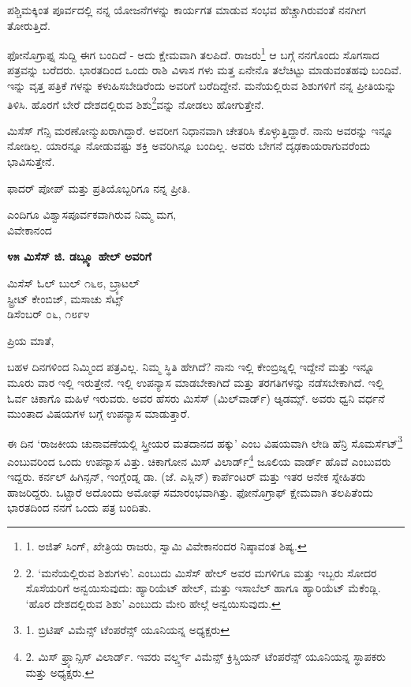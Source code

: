 ಪಶ್ಚಿಮಕ್ಕಿಂತ ಪೂರ್ವದಲ್ಲಿ ನನ್ನ ಯೋಜನೆಗಳನ್ನು ಕಾರ್ಯಗತ ಮಾಡುವ ಸಂಭವ ಹೆಚ್ಚಾಗಿರುವಂತೆ ನನಗೀಗ ತೋರುತ್ತಿದೆ.

ಫೋನೊಗ್ರಾಫ್ನ ಸುದ್ದಿ ಈಗ ಬಂದಿದೆ - ಅದು ಕ್ಷೇಮವಾಗಿ ತಲಪಿದೆ. ರಾಜರು\footnote{1. ಅಜಿತ್ ಸಿಂಗ್, ಖೇತ್ರಿಯ ರಾಜರು, ಸ್ವಾಮಿ ವಿವೇಕಾನಂದರ ನಿಷ್ಠಾವಂತ ಶಿಷ್ಯ.} ಆ ಬಗ್ಗೆ ನನಗೊಂದು ಸೊಗಸಾದ ಪತ್ರವನ್ನು ಬರೆದರು. ಭಾರತದಿಂದ ಒಂದು ರಾಶಿ ವಿಳಾಸ ಗಳು ಮತ್ತ ಏನೇನೊ ತಲೆಚಿಟ್ಟು ಮಾಡುವಂತಹವು ಬಂದಿವೆ. ಇನ್ನು ವೃತ್ತ ಪತ್ರಿಕೆ ಗಳನ್ನು ಕಳುಹಿಸಬೇಡಿರೆಂದು ಅವರಿಗೆ ಬರೆದಿದ್ದೇನೆ. ಮನೆಯಲ್ಲಿರುವ ಶಿಶುಗಳಿಗೆ ನನ್ನ ಪ್ರೀತಿಯನ್ನು ತಿಳಿಸಿ. ಹೊರಗೆ ಬೇರೆ ದೇಶದಲ್ಲಿರುವ ಶಿಶು\footnote{2. ‘ಮನೆಯಲ್ಲಿರುವ ಶಿಶುಗಳು’. ಎಂಬುದು ಮಿಸೆಸ್ ಹೇಲ್ ಅವರ ಮಗಳಿಗೂ ಮತ್ತು ಇಬ್ಬರು ಸೋದರ ಸೊಸೆಯರಿಗೆ ಅನ್ವಯಿಸುವುದು: ಹ್ಯಾರಿಯೆಟ್ ಹೇಲ್, ಮತ್ತು ಇಸಾಬೆಲ್ ಹಾಗೂ ಹ್ಯಾರಿಯೆಟ್ ಮೆಕೆಂಡ್ಲಿ. ‘ಹೊರ ದೇಶದಲ್ಲಿರುವ ಶಿಶು’ ಎಂಬುದು ಮೇರಿ ಹೇಲ್ಗೆ ಅನ್ವಯಿಸುವುದು.}ವನ್ನು ನೋಡಲು ಹೋಗುತ್ತೇನೆ.

ಮಿಸೆಸ್ ಗೆನ್ಸಿ ಮರಣೋನ್ಮುಖರಾಗಿದ್ದಾರೆ. ಅವರೀಗ ನಿಧಾನವಾಗಿ ಚೇತರಿಸಿ ಕೊಳ್ಳುತ್ತಿದ್ದಾರೆ. ನಾನು ಅವರನ್ನು ಇನ್ನೂ ನೋಡಿಲ್ಲ. ಯಾರನ್ನೂ ನೋಡುವಷ್ಟು ಶಕ್ತಿ ಅವರಿಗಿನ್ನೂ ಬಂದಿಲ್ಲ. ಅವರು ಬೇಗನೆ ದೃಢಕಾಯರಾಗುವರೆಂದು ಭಾವಿಸುತ್ತೇನೆ.

ಫಾದರ್ ಪೋಪ್ ಮತ್ತು ಪ್ರತಿಯೊಬ್ಬರಿಗೂ ನನ್ನ ಪ್ರೀತಿ.

\begin{flushright}
ಎಂದಿಗೂ ವಿಶ್ವಾಸಪೂರ್ವಕವಾಗಿರುವ ನಿಮ್ಮ ಮಗ,\\ವಿವೇಕಾನಂದ
\end{flushright}

\begin{center}
\textbf{೪೫ ಮಿಸೆಸ್ ಜಿ. ಡಬ್ಲ್ಯೂ ಹೇಲ್ ಅವರಿಗೆ}
\end{center}

\begin{flushright}
 ಮಿಸೆಸ್ ಓಲ್ ಬುಲ್ ೧೬೮, ಬ್ರ್ಯಾಟಲ್\\ಸ್ಟ್ರೀಟ್ ಕೇಂಬಿಜ್, ಮಸಾಚು ಸೆಟ್ಸ್\\ಡಿಸೆಂಬರ್ ೦೬, ೧೮೯೪
\end{flushright}

ಪ್ರಿಯ ಮಾತೆ,

ಬಹಳ ದಿನಗಳಿಂದ ನಿಮ್ಮಿಂದ ಪತ್ರವಿಲ್ಲ. ನಿಮ್ಮ ಸ್ಥಿತಿ ಹೇಗಿದೆ? ನಾನು ಇಲ್ಲಿ ಕೇಂಬ್ರಿಜ್ನಲ್ಲಿ ಇದ್ದೇನೆ ಮತ್ತು ಇನ್ನೂ ಮೂರು ವಾರ ಇಲ್ಲಿ ಇರುತ್ತೇನೆ. ಇಲ್ಲಿ ಉಪನ್ಯಾಸ ಮಾಡಬೇಕಾಗಿದೆ ಮತ್ತು ತರಗತಿಗಳನ್ನು ನಡೆಸಬೇಕಾಗಿದೆ. ಇಲ್ಲಿ ಓರ್ವ ಚಿಕಾಗೊ ಮಹಿಳೆ ಇರುವರು. ಅವರ ಹೆಸರು ಮಿಸೆಸ್ (ಮಿಲ್​ವಾರ್ಡ್) ಆ್ಯಡಮ್ಸ್. ಅವರು ಧ್ವನಿ ವರ್ಧನೆ ಮುಂತಾದ ವಿಷಯಗಳ ಬಗ್ಗೆ ಉಪನ್ಯಾಸ ಮಾಡುತ್ತಾರೆ.

ಈ ದಿನ ‘ರಾಜಕೀಯ ಚುನಾವಣೆಯಲ್ಲಿ ಸ್ತ್ರೀಯರ ಮತದಾನದ ಹಕ್ಕು’ ಎಂಬ ವಿಷಯವಾಗಿ ಲೇಡಿ ಹೆನ್ರಿ ಸೊಮರ್ಸೆಟ್\footnote{1. ಬ್ರಿಟಿಷ್ ವಿಮೆನ್ಸ್ ಟೆಂಪರೆನ್ಸ್ ಯೂನಿಯನ್ನ ಅಧ್ಯಕ್ಷರು} ಎಂಬುವರಿಂದ ಒಂದು ಉಪನ್ಯಾಸ ವಿತ್ತು. ಚಿಕಾಗೋನ ಮಿಸ್ ವಿಲಾರ್ಡ್\footnote{2. ಮಿಸ್ ಫ್ರ್ಯಾನ್ಸಿಸ್ ವಿಲಾರ್ಡ್. ಇವರು ವರ್ಲ್ಡ್ಸ್ ವಿಮೆನ್ಸ್ ಕ್ರಿಸ್ಚಿಯನ್ ಟೆಂಪರೆನ್ಸ್ ಯೂನಿಯನ್ನ ಸ್ಥಾಪಕರು ಮತ್ತು ಅಧ್ಯಕ್ಷರು.} ಜೂಲಿಯ ವಾರ್ಡ್ ಹೊವೆ ಎಂಬುವರು ಇದ್ದರು. ಕರ್ನಲ್ ಹಿಗಿನ್ಸನ್, ಇಂಗ್ಲೆಂಡ್ನ ಡಾ. (ಜೆ. ಎಸ್ಲಿನ್) ಕಾರ್ಪೆಂಟರ್ ಮತ್ತು ಇತರ ಅನೇಕ ಸ್ನೇಹಿತರು ಹಾಜರಿದ್ದರು. ಒಟ್ಟಾರೆ ಅದೊಂದು ಅಮೋಘ ಸಮಾರಂಭವಾಗಿತ್ತು. ಫೋನೊಗ್ರಾಫ್ ಕ್ಷೇಮವಾಗಿ ತಲಪಿತೆಂದು ಭಾರತದಿಂದ ನನಗೆ ಒಂದು ಪತ್ರ ಬಂದಿತು.

